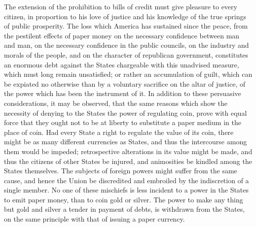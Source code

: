 The extension of the prohibition to bills of credit must give pleasure to every citizen, in proportion to his love of justice and his knowledge of the true springs of public prosperity. 
The loss which America has sustained since the peace, from the pestilent effects of paper money on the necessary confidence between man and man, on the necessary confidence in the public councils, on the industry and morals of the people, and on the character of republican government, constitutes an enormous debt against the States chargeable with this unadvised measure, which must long remain unsatisfied; or rather an accumulation of guilt, which can be expiated no otherwise than by a voluntary sacrifice on the altar of justice, of the power which has been the instrument of it. 
In addition to these persuasive considerations, it may be observed, that the same reasons which show the necessity of denying to the States the power of regulating coin, prove with equal force that they ought not to be at liberty to substitute a paper medium in the place of coin. 
Had every State a right to regulate the value of its coin, there might be as many different currencies as States, and thus the intercourse among them would be impeded; retrospective alterations in its value might be made, and thus the citizens of other States be injured, and animosities be kindled among the States themselves. 
The subjects of foreign powers might suffer from the same cause, and hence the Union be discredited and embroiled by the indiscretion of a single member. 
No one of these mischiefs is less incident to a power in the States to emit paper money, than to coin gold or silver. 
The power to make any thing but gold and silver a tender in payment of debts, is withdrawn from the States, on the same principle with that of issuing a paper currency.

